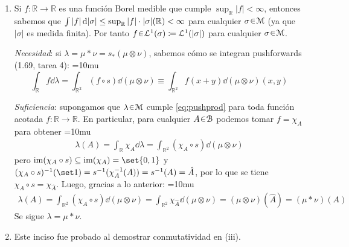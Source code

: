\begin{sol}
\begin{enumerate}[label=(\roman*)]
{\begin{align*}
&=\int_{\mathbb{R}} \int_{A} f(y-x)g(x)\dd{m(y)} \dd{m(x)}\\
&= \int_{A} \int_{\mathbb{R}}f(y-x)g(x)\dd{m(x)}\dd{m(y)} \\
&= \int_{A} (f*g)(y)\dd{m(y)}
= \mu_{f*g}(A)
\end{align*}}%
Esto prueba que $\mu_f *\mu_g=\mu_{f*g}$.
\item %
Si $f\colon \mathbb{R} \to \mathbb{R}$ es una función Borel medible que cumple $\sup_{\mathbb{R}}|f| < \infty$, entonces sabemos que $\int |f| \dd{|\sigma|} \leq \sup_\mathbb{R}|f| \cdot \abs{\sigma}(\mathbb{R}) < \infty$ para cualquier $\sigma\en\mathcal{M}$ (ya que $|\sigma|$ es medida finita). Por tanto $f\en\mathcal{L}^1(\sigma)\coloneq\mathcal{L}^1(|\sigma|)$ para cualquier $\sigma\en\mathcal{M}$.\par
\medskip
\emph{Necesidad}: si $\lambda = \mu*\nu = s_*(\mu\otimes\nu)$, sabemos cómo se integran pushforwards (1.69, tarea 4):
{\thickmuskip=10mu
\begin{equation}\label{eq:pushprod}
\int_{\mathbb{R}} f \dd{\lambda}
= \int_{\mathbb{R}^2} (f \circ s) \dd{(\mu\otimes\nu)}
\equiv \int_{\mathbb{R}^2} f(x+y) \dd{(\mu\otimes\nu)(x,y)}
\end{equation}}\par
\medskip
\emph{Suficiencia}: supongamos que $\lambda\en\mathcal{M}$ cumple \eqref{eq:pushprod} para toda función acotada $f\colon\mathbb{R}\to \mathbb{R}$. En particular, para cualquier $A\en\mathcal{B}$ podemos tomar $f = \chi_A$ para obtener
{\thickmuskip=10mu
\begin{align*}
\lambda(A)
=\int_{\mathbb{R}} \chi_A \dd{\lambda}
= \int_{\mathbb{R}^2} (\chi_A \circ s) \dd{(\mu\otimes\nu)}
\end{align*}}%
pero $\im(\chi_A\circ s) \subseteq \im(\chi_A) = \set{0,1}$ y $(\chi_A\circ s)^{-1}(\set1) = s^{-1}(\chi_A^{-1}(A)) = s^{-1}(A) = \hat{A}$, por lo que se tiene $\chi_A\circ s = \chi_{\hat{A}}$. Luego, gracias a lo anterior:
{\thickmuskip=10mu
\begin{align*}
\lambda(A)
= \int_{\mathbb{R}^2} (\chi_A \circ s) \dd{(\mu\otimes\nu)}
= \int_{\mathbb{R}^2} \chi_{\hat{A}} \dd{(\mu\otimes\nu)}
= (\mu\otimes\nu)(\hat{A})
= (\mu*\nu)(A)
\end{align*}}%
Se sigue $\lambda = \mu*\nu$.
\item %
Este inciso fue probado al demostrar conmutatividad en (iii).
\end{enumerate}
\end{sol}